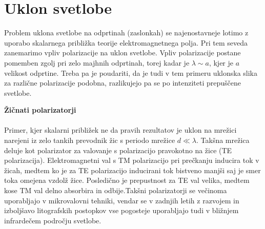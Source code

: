 \section{Uklon svetlobe}

Problem uklona svetlobe na odprtinah (zaslonkah) se najenostavneje lotimo z uporabo
skalarnega približka teorije elektromagnetnega polja. Pri tem seveda zanemarimo vpliv 
polarizacije na uklon svetlobe. Vpliv polarizacije
postane pomemben zgolj pri zelo majhnih odprtinah, torej kadar je $\lambda\sim a$, kjer je $a$ velikost
odprtine. Treba pa je poudariti, da je tudi v tem primeru uklonska slika za različne polarizacije podobna, 
razlikujejo pa se po intenziteti prepuščene svetlobe.


\begin{remark}{{\bf Žičnati polarizatorji}}\\ \\
Primer, kjer skalarni približek ne da pravih rezultatov je uklon na mrežici narejeni 
iz zelo tankih prevodnik žic s periodo mrežice $d\ll \lambda$. Takšna mrežica 
deluje kot polarizator za valovanje s polarizacijo pravokotno na žice (TE polarizacija). 
Elektromagnetni val s TM polarizacijo pri prečkanju inducira tok v žicah, medtem
ko je za TE polarizacijo inducirani tok bistveno manjši saj je smer toka omejena
vzdolž žice. Posledično je prepustnost za TE val velika, medtem kose TM val delno
absorbira in odbije.Takšni polarizatorji se večinoma uporabljajo v mikrovalovni tehniki, 
vendar se v zadnjih letih z razvojem in izboljšavo litografskih postopkov
vse pogosteje uporabljajo tudi v bližnjem infrardečem področju svetlobe.
\end{remark}


